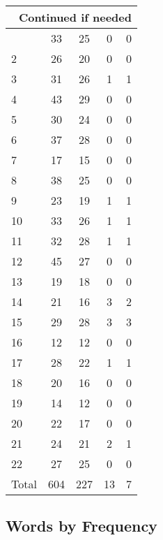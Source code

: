 \begin{center}
\begin{longtable}{l|c|c|c|c}
\hline \multicolumn{5}{|r|}{{Continued if needed}} \\ \hline
\endfoot 
1 & 33 & 25 & 0 & 0\\ \hline
2 & 26 & 20 & 0 & 0\\ \hline
3 & 31 & 26 & 1 & 1\\ \hline
4 & 43 & 29 & 0 & 0\\ \hline
5 & 30 & 24 & 0 & 0\\ \hline
6 & 37 & 28 & 0 & 0\\ \hline
7 & 17 & 15 & 0 & 0\\ \hline
8 & 38 & 25 & 0 & 0\\ \hline
9 & 23 & 19 & 1 & 1\\ \hline
10 & 33 & 26 & 1 & 1\\ \hline
11 & 32 & 28 & 1 & 1\\ \hline
12 & 45 & 27 & 0 & 0\\ \hline
13 & 19 & 18 & 0 & 0\\ \hline
14 & 21 & 16 & 3 & 2\\ \hline
15 & 29 & 28 & 3 & 3\\ \hline
16 & 12 & 12 & 0 & 0\\ \hline
17 & 28 & 22 & 1 & 1\\ \hline
18 & 20 & 16 & 0 & 0\\ \hline
19 & 14 & 12 & 0 & 0\\ \hline
20 & 22 & 17 & 0 & 0\\ \hline
21 & 24 & 21 & 2 & 1\\ \hline
22 & 27 & 25 & 0 & 0\\ \hline
\hline \hline
Total & 604 & 227 & 13 & 7



\end{longtable}
\end{center}

 
\subsection{Words by Frequency}

